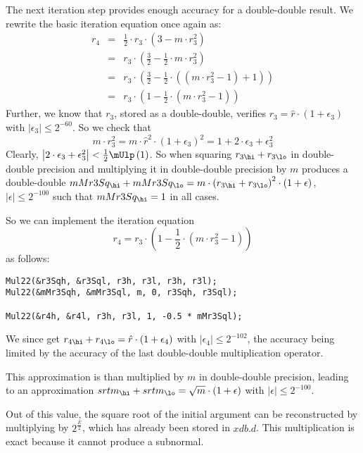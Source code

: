 The next iteration step provides enough accuracy for a double-double result.
We rewrite the basic iteration equation once again as:
\begin{eqnarray*}
r_4 & = & \frac{1}{2} \cdot r_3 \cdot \left( 3 - m \cdot r_3^2 \right) \\
& = & r_3 \cdot \left( \frac{3}{2} - \frac{1}{2} \cdot m \cdot r_3^2 \right) \\
& = & r_3 \cdot \left( \frac{3}{2} - \frac{1}{2} \cdot \left( \left( m \cdot r_3^2 - 1 \right) + 1 \right) \right) \\
& = & r_3 \cdot \left( 1 - \frac{1}{2} \cdot \left( m \cdot r_3^2 - 1 \right) \right)
\end{eqnarray*}
Further, we know that $r_3$, stored as a double-double, verifies $r_3
= \hat{r} \cdot \left( 1 + \epsilon_3 \right)$ with $\left \vert
\epsilon_3 \right \vert \leq 2^{-60}$. So we check that
$$m \cdot r_3^2 = m \cdot \hat{r}^2 \cdot \left( 1 +
\epsilon_3 \right)^2 = 1 + 2 \cdot \epsilon_3 + \epsilon_3^2$$
Clearly, $\left \vert 2 \cdot \epsilon_3 + \epsilon_3^2 \right \vert <
\frac{1}{2} \mUlp\left( 1 \right)$. So when squaring $r_{3\hi} + r_{3\lo}$ in double-double precision
and multiplying it in double-double precision by $m$ produces a
double-double $mMr3Sq_\hi + mMr3Sq_\lo = m \cdot \left( r_{3\hi} +
r_{3\lo} \right)^2 \cdot \left( 1 + \epsilon \right)$, $\left \vert
\epsilon \right \vert \leq 2^{-100}$ such that $mMr3Sq_\hi = 1$ in all
cases.

So we can implement the iteration equation 
$$r_4 = r_3 \cdot \left( 1 - \frac{1}{2} \cdot \left( m \cdot r_3^2 - 1 \right) \right)$$
as follows:
\begin{lstlisting}[caption={Newton iteration - second double-double step},firstnumber=1]
Mul22(&r3Sqh, &r3Sql, r3h, r3l, r3h, r3l); 
Mul22(&mMr3Sqh, &mMr3Sql, m, 0, r3Sqh, r3Sql);

Mul22(&r4h, &r4l, r3h, r3l, 1, -0.5 * mMr3Sql);
\end{lstlisting}
We since get $r_{4\hi} + r_{4\lo} = \hat{r} \cdot \left( 1 +
\epsilon_4 \right)$ with $\left \vert \epsilon_4 \right \vert \leq
2^{-102}$, the accuracy being limited by the accuracy of the last
double-double multiplication operator.

This approximation is than multiplied by $m$ in double-double
precision, leading to an approximation $srtm_\hi + srtm_\lo = \sqrt{m}
\cdot \left( 1 + \epsilon \right)$ with $\left \vert \epsilon \right \vert \leq
2^{-100}$.

Out of this value, the square root of the initial argument can be
reconstructed by multiplying by $2^{\frac{E}{2}}$, which has already
been stored in $xdb.d$. This multiplication is exact because it cannot
produce a subnormal.

